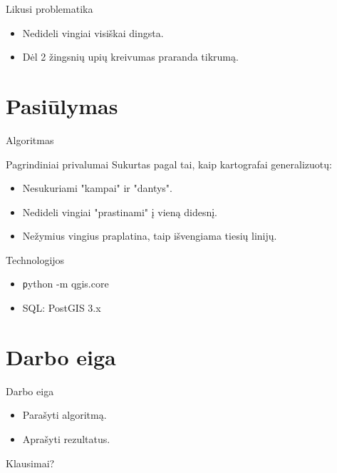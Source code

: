 \documentclass[14pt]{beamer}
\begin{document}
\begin{frame}{Likusi problematika}
    \pause
    \begin{itemize}[<+->]
        \item Nedideli vingiai visiškai dingsta.
        \item Dėl 2 žingsnių upių kreivumas praranda tikrumą.
    \end{itemize}
\end{frame}

\section{Pasiūlymas}

\begin{frame}{Algoritmas}
    \begin{center}
    \end{center}
\end{frame}

\begin{frame}{Pagrindiniai privalumai}
    Sukurtas pagal tai, kaip kartografai generalizuotų:
    \pause
    \begin{itemize}[<+->]
        \item Nesukuriami "kampai" ir "dantys".
        \item Nedideli vingiai "prastinami" į vieną didesnį.
        \item Nežymius vingius praplatina, taip išvengiama tiesių linijų.
    \end{itemize}
\end{frame}

\begin{frame}{Technologijos}
    \begin{itemize}[<+->]
        \item {\texttt python -m qgis.core}
        \item SQL: PostGIS 3.x
    \end{itemize}
\end{frame}

\section{Darbo eiga}

\begin{frame}{Darbo eiga}
    \begin{itemize}[<+->]
        \item Parašyti algoritmą.
        \item Aprašyti rezultatus.
    \end{itemize}
\end{frame}

\begin{frame}{Klausimai?}
\end{frame}
\end{document}
